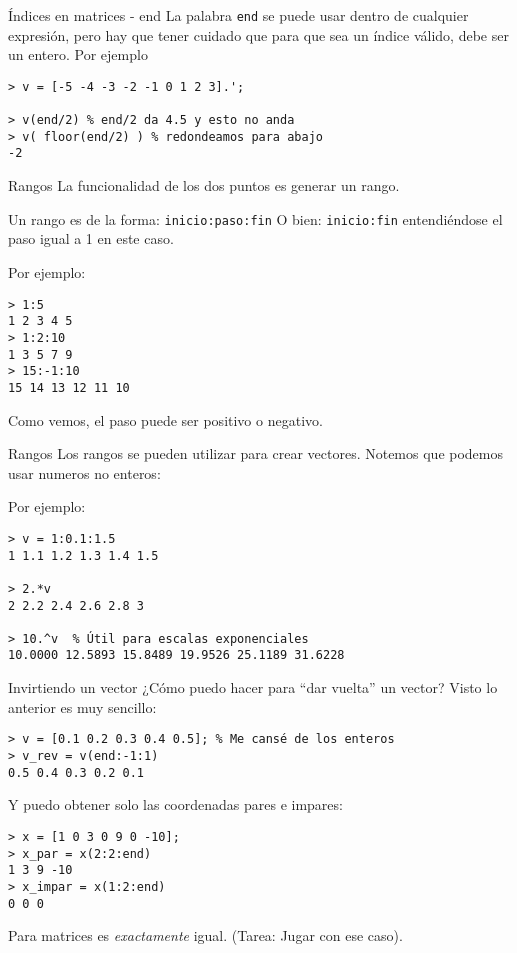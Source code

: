 \begin{frame}[fragile]{Índices en matrices - end}
La palabra \verb!end! se puede usar dentro de cualquier expresión, pero hay que tener cuidado que para que sea un índice válido, debe ser un entero. Por ejemplo

\begin{lstlisting}
> v = [-5 -4 -3 -2 -1 0 1 2 3].';

> v(end/2) % end/2 da 4.5 y esto no anda
> v( floor(end/2) ) % redondeamos para abajo
-2
\end{lstlisting}

\end{frame}

\begin{frame}[fragile]{Rangos}
La funcionalidad de los dos puntos es generar un rango.

Un rango es de la forma: \verb!inicio:paso:fin!
O bien: \verb!inicio:fin! entendiéndose el paso igual a 1 en este caso.

Por ejemplo:
\begin{lstlisting}
> 1:5
1 2 3 4 5
> 1:2:10
1 3 5 7 9
> 15:-1:10
15 14 13 12 11 10
\end{lstlisting}

Como vemos, el paso puede ser positivo o negativo.

\end{frame}

\begin{frame}[fragile]{Rangos}
Los rangos se pueden utilizar para crear vectores. Notemos que podemos usar numeros no enteros:

Por ejemplo:
\begin{lstlisting}
> v = 1:0.1:1.5
1 1.1 1.2 1.3 1.4 1.5

> 2.*v
2 2.2 2.4 2.6 2.8 3

> 10.^v  % Útil para escalas exponenciales
10.0000 12.5893 15.8489 19.9526 25.1189 31.6228
\end{lstlisting}
\end{frame}

\begin{frame}[fragile]{Invirtiendo un vector}
¿Cómo puedo hacer para ``dar vuelta'' un vector? Visto lo anterior es muy sencillo:

\begin{lstlisting}
> v = [0.1 0.2 0.3 0.4 0.5]; % Me cansé de los enteros
> v_rev = v(end:-1:1)
0.5 0.4 0.3 0.2 0.1
\end{lstlisting}

Y puedo obtener solo las coordenadas pares e impares:
\begin{lstlisting}
> x = [1 0 3 0 9 0 -10];
> x_par = x(2:2:end)
1 3 9 -10
> x_impar = x(1:2:end)
0 0 0
\end{lstlisting}

Para matrices es \emph{exactamente} igual. (Tarea: Jugar con ese caso).

\end{frame}

